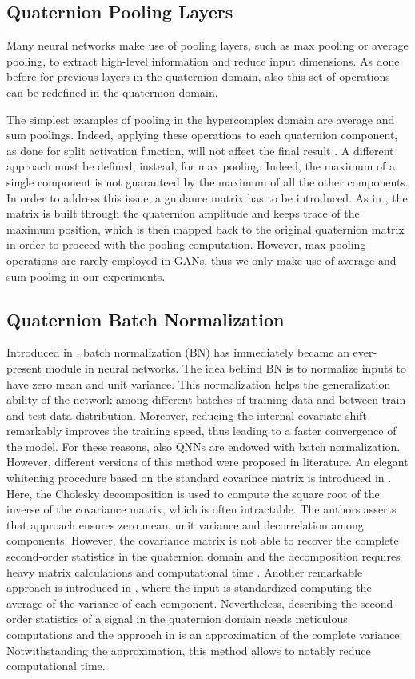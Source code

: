 \documentclass[graybox]{svmult}
\begin{document}
\subsection{Quaternion Pooling Layers}
\noindent Many neural networks make use of pooling layers, such as max pooling or average pooling, to extract high-level information and reduce input dimensions. As done before for previous layers in the quaternion domain, also this set of operations can be redefined in the quaternion domain.

The simplest examples of pooling in the hypercomplex domain are average and sum poolings. Indeed, applying these operations to each quaternion component, as done for split activation function, will not affect the final result \cite{QilinQCNN2019}. A different approach must be defined, instead, for max pooling. Indeed, the maximum of a single component is not guaranteed by the maximum of all the other components. In order to address this issue, a guidance matrix has to be introduced. As in \cite{QilinQCNN2019}, the matrix is built through the quaternion amplitude and keeps trace of the maximum position, which is then mapped back to the original quaternion matrix in order to proceed with the pooling computation. However, max pooling operations are rarely employed in GANs, thus we only make use of average and sum pooling in our experiments.

\subsection{Quaternion Batch Normalization}
\noindent Introduced in \cite{IoffeBN2015}, batch normalization (BN) has immediately became an ever-present module in neural networks. The idea behind BN is to normalize inputs to have zero mean and unit variance. This normalization helps the generalization ability of the network among different batches of training data and between train and test data distribution. 
Moreover, reducing the internal covariate shift remarkably improves the training speed, thus leading to a faster convergence of the model.
For these reasons, also QNNs are endowed with batch normalization. However, different versions of this method were proposed in literature. An elegant whitening procedure based on the standard covarince matrix is introduced in \cite{GaudetIJCNN2018}. Here, the Cholesky decomposition is used to compute the square root of the inverse of the covariance matrix, which is often intractable. The authors asserts that approach ensures zero mean, unit variance and decorrelation among components. However, the covariance matrix is not able to recover the complete second-order statistics in the quaternion domain \cite{TookSIGPRO2011} and the decomposition requires heavy matrix calculations and computational time \cite{HoffmanAlgebraNets2020}. Another remarkable approach is introduced in \cite{VecchiTIT2020}, where the input is standardized computing the average of the variance of each component. Nevertheless, describing the second-order statistics of a signal in the quaternion domain needs meticulous computations and the approach in \cite{VecchiTIT2020} is an approximation of the complete variance. Notwithstanding the approximation, this method allows to notably reduce computational time.
\end{document}
